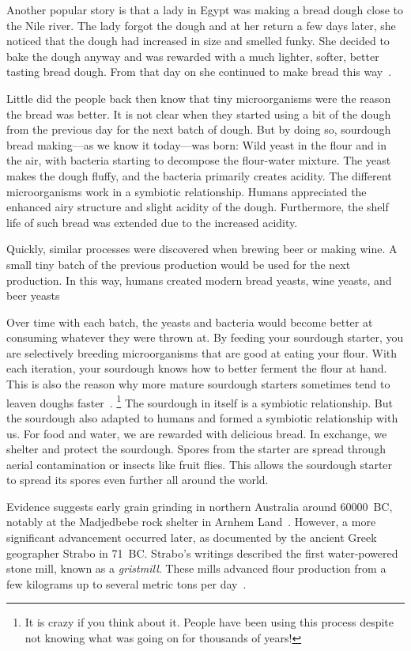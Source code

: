 Another popular story is that a lady in Egypt was making
a bread dough close to the Nile river. The lady forgot the
dough and at her return a few days later, she noticed that the dough had
increased in size and smelled funky. She decided to bake
the dough anyway and was rewarded with a much
lighter, softer, better tasting bread dough. From that day
on she continued to make bread this way~\cite{egyptian+bread}.

Little did the people back then know that tiny microorganisms
were the reason the bread was better. It is not clear when
they started using a bit of the dough from the previous
day for the next batch of dough. But by doing so, sourdough
bread making---as we know it today---was born: Wild yeast
in the flour and in the air, with bacteria
starting to decompose the flour-water mixture.
The yeast makes the dough fluffy,
and the bacteria primarily creates acidity. The different
microorganisms work in a symbiotic relationship. Humans
appreciated the enhanced airy structure and slight acidity
of the dough. Furthermore, the shelf life of such bread
was extended due to the increased acidity.

Quickly, similar processes were discovered when brewing beer
or making wine. A small tiny batch of the previous production
would be used for the next production. In this way, humans created
modern bread yeasts, wine yeasts, and beer yeasts~\cite{egypt+beer}

Over time with each batch, the yeasts and bacteria
would become better at consuming whatever they were thrown at.
By feeding your sourdough starter, you are selectively breeding
microorganisms that are good at eating your flour. With
each iteration, your sourdough knows how to better ferment the flour
at hand. This is also the reason why more mature sourdough starters sometimes
tend to leaven doughs faster~\cite{review+of+sourdough+starters}.
\footnote{It is crazy if you
think about it. People have been using this process despite not
knowing what was going on for thousands of years!} The
sourdough in itself is a symbiotic relationship. But the sourdough
also adapted to humans and formed a symbiotic relationship with us.
For food and water, we are rewarded with delicious bread. In exchange,
we shelter and protect the sourdough. Spores from the starter
are spread through aerial contamination or insects like fruit flies.
This allows the sourdough starter to spread its spores even
further all around the world.

Evidence suggests early grain grinding in northern Australia around \num{60000}~BC,
notably at the Madjedbebe rock shelter in Arnhem Land~\cite{aboriginal+grinding+stones}.
However,
a more significant advancement occurred later, as documented by
the ancient Greek geographer Strabo in \num{71}~BC. Strabo's writings
described the first water-powered stone mill, known as
a \emph{gristmill}. These mills advanced flour production
from a few kilograms up to several metric tons per day~\cite{history+mills}.

